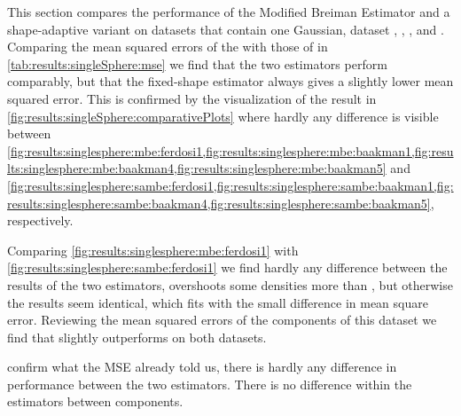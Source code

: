 
\begin{figure*}
	\centering
	
	\caption{Plot of the estimated density as a function of the known density of the datasets with a single Gaussian by - \mbe and - \sambe.}
	\label{fig:results:singleSphere:comparativePlots}
\end{figure*}

\begin{table}
	\centering
	
	\caption{Performance of the Modified Breiman Estimator with fixed-shaped and shape-adaptive kernels on the datasets with a single Gaussian.} 	
	\label{tab:results:singleSphere:mse}
\end{table}

This section compares the performance of the Modified Breiman Estimator and a shape-adaptive variant on datasets that contain one Gaussian, \ie dataset \ferdosiOne, \baakmanOne, \baakmanFour, and \baakmanFive. Comparing the mean squared errors of the \mbe with those of \sambe in \cref{tab:results:singleSphere:mse} we find that the two estimators perform comparably, but that the fixed-shape estimator always gives a slightly lower mean squared error. This is confirmed by the visualization of the result in \cref{fig:results:singleSphere:comparativePlots} where hardly any difference is visible between \cref{fig:results:singlesphere:mbe:ferdosi1,fig:results:singlesphere:mbe:baakman1,fig:results:singlesphere:mbe:baakman4,fig:results:singlesphere:mbe:baakman5} and \cref{fig:results:singlesphere:sambe:ferdosi1,fig:results:singlesphere:sambe:baakman1,fig:results:singlesphere:sambe:baakman4,fig:results:singlesphere:sambe:baakman5}, respectively.

		Comparing \cref{fig:results:singlesphere:mbe:ferdosi1} with \cref{fig:results:singlesphere:sambe:ferdosi1} we find hardly any difference between the results of the two estimators, \sambe overshoots some densities more than \mbe, but otherwise the results seem identical, which fits with the small difference in mean square error. 
		Reviewing the mean squared errors of the components of this dataset we find that \mbe slightly outperforms \sambe on both datasets.

		 confirm what the MSE already told us, there is hardly any difference in performance between the two estimators. 
		There is no difference within the estimators between components. 

